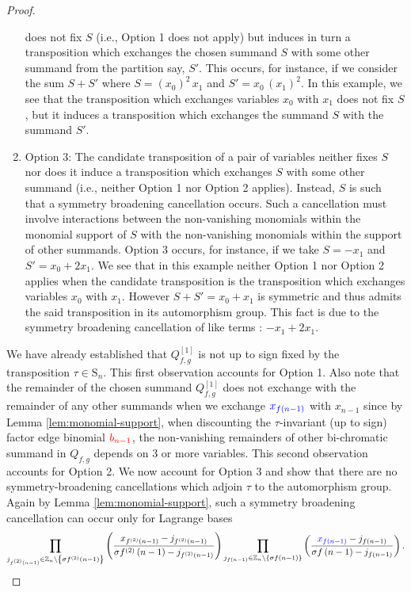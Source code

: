 \begin{proof}
\begin{enumerate}
does not fix $S$ (i.e., Option 1 does not apply) but induces in turn
a transposition which exchanges the chosen summand $S$ with some
other summand from the partition say, $S'$. This occurs, for instance,
if we consider the sum $S+S'$ where $S=(x_{0})^{2}\,x_{1}$ and $S'=x_{0}\,(x_{1})^{2}$.
In this example, we see that the transposition which exchanges variables
$x_{0}$ with $x_{1}$ does not fix $S$, but it induces a transposition
which exchanges the summand $S$ with the summand $S'$.
\item Option 3: The candidate transposition of a pair of variables neither
fixes $S$ nor does it induce a transposition which exchanges $S$
with some other summand (i.e., neither Option 1 nor Option 2 applies).
Instead, $S$ is such that a symmetry broadening cancellation occurs.
Such a cancellation must involve interactions between the non-vanishing
monomials within the monomial support of $S$ with the non-vanishing monomials
within the support of other summands. Option 3 occurs, for instance,
if we take $S=-x_{1}$ and $S'=x_{0}+2x_{1}$. We see that in this
example neither Option 1 nor Option 2 applies when the candidate transposition
is the transposition which exchanges variables $x_{0}$ with $x_{1}$.
However $S+S'=x_{0}+x_{1}$ is symmetric and thus admits the said transposition
in its automorphism group. This fact is due to the symmetry broadening
cancellation of like terms : $-x_{1}+2x_{1}$.
\end{enumerate}
We have already established that $Q_{f,g}^{\left[1\right]}$ is not up to sign fixed by the transposition $\tau\in\text{S}_{n}$. This first observation accounts for Option 1. Also note that the remainder
of the chosen summand $Q_{f,g}^{\left[1\right]}$ does not exchange with the remainder of any
other summands when we exchange ${\color{blue}x_{f\left(n-1\right)}}$
with $x_{n-1}$ since by Lemma \ref{lem:monomial-support}, when discounting the $\tau$-invariant (up to sign) factor edge binomial ${\color{red}b_{n-1}}$, the non-vanishing remainders of other
bi-chromatic summand in $Q_{f,g}$  depends on $3$ or more variables.
This second observation accounts for Option 2. We now account for
Option 3 and show that there are no symmetry-broadening
cancellations which adjoin $\tau$ to the automorphism group. Again by Lemma \ref{lem:monomial-support}, such a symmetry broadening cancellation
can occur only for Lagrange bases
\[
\prod_{j_{f^{(2)}\left(n-1\right)}\in\mathbb{Z}_{n}\backslash\left\{ \sigma f^{(2)}\left(n-1\right)\right\} }\left(\frac{x_{f^{(2)}\left(n-1\right)}-j_{f^{(2)}\left(n-1\right)}}{\sigma f^{(2)}\left(n-1\right)-j_{f^{(2)}\left(n-1\right)}}\right)\prod_{j_{f\left(n-1\right)}\in\mathbb{Z}_{n}\backslash\left\{ \sigma f\left(n-1\right)\right\} }\left(\frac{{\color{blue}x_{f\left(n-1\right)}}-j_{f\left(n-1\right)}}{\sigma f\left(n-1\right)-j_{f\left(n-1\right)}}\right).
\]
\end{proof}
